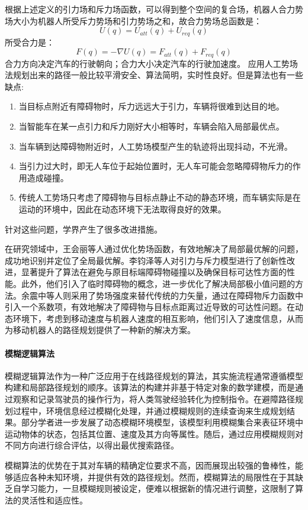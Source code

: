 \documentclass{report}
\begin{document}
根据上述定义的引力场和斥力场函数，可以得到整个空间的复合场，机器人合力势场大小为机器人所受斥力势场和引力势场之和，故合力势场总函数是：
\[ U(q)=U_{att}(q)+U_{req}(q) \]
所受合力是：
\[ F(q)=-\nabla U(q)=F_{att}(q)+F_{req}(q) \]
合力方向决定汽车的行驶朝向；合力大小决定汽车的行驶加速度。
\newpage
应用人工势场法规划出来的路径一般比较平滑安全、算法简明，实时性良好。但是算法也有一些缺点:
\begin{enumerate}
\item 当目标点附近有障碍物时，斥力远远大于引力，车辆将很难到达目的地。
\item 当智能车在某一点引力和斥力刚好大小相等时，车辆会陷入局部最优点。
\item 当车辆到达障碍物附近时，人工势场模型产生的轨迹将出现抖动，不光滑\cite{jh8}。
\item 当引力过大时，即无人车位于起始位置时，无人车可能会忽略障碍物斥力的作用造成碰撞\cite{jh7}。
  \item 传统人工势场只考虑了障碍物与目标点静止不动的静态环境，而车辆实际是在运动的环境中，因此在动态环境下无法取得良好的效果。
\end{enumerate}
针对这些问题，学界产生了很多改进措施。

在研究领域中，王会丽等人通过优化势场函数，有效地解决了局部最优解的问题，成功地识别并定位了全局最优解。李钧泽等人对引力与斥力模型进行了创新性改进，显著提升了算法在避免与原目标端障碍物碰撞以及确保目标可达性方面的性能。此外，他们引入了临时障碍物的概念，进一步优化了解决局部极小值问题的方法。余震中等人则采用了势场强度来替代传统的力矢量，通过在障碍物斥力函数中引入一个系数项，有效地解决了障碍物与目标点距离过近导致的可达性问题。在动态环境下，考虑到移动速度与机器人速度的相互影响，他们引入了速度信息，从而为移动机器人的路径规划提供了一种新的解决方案\cite{jh5}。

\paragraph{模糊逻辑算法}

模糊逻辑算法作为一种广泛应用于在线路径规划的算法，其实施流程通常遵循模型构建和局部路径规划的顺序。该算法的构建并非基于特定对象的数学建模，而是通过观察和记录驾驶员的操作行为，将人类驾驶经验转化为控制指令。在避障路径规划过程中，环境信息经过模糊化处理，并通过模糊规则的连续查询来生成规划结果。部分学者进一步发展了动态模糊环境模型，该模型利用模糊集合来表征环境中运动物体的状态，包括其位置、速度及其方向等属性。随后，通过应用模糊规则对不同方向进行综合评估，以得出最优搜索路径。

模糊算法的优势在于其对车辆的精确定位要求不高，因而展现出较强的鲁棒性，能够适应各种未知环境，并提供有效的路径规划。然而，模糊算法的局限性在于其缺乏自学习能力，一旦模糊规则被设定，便难以根据新的情况进行调整，这限制了算法的灵活性和适应性\cite{jh6}。
\end{document}
